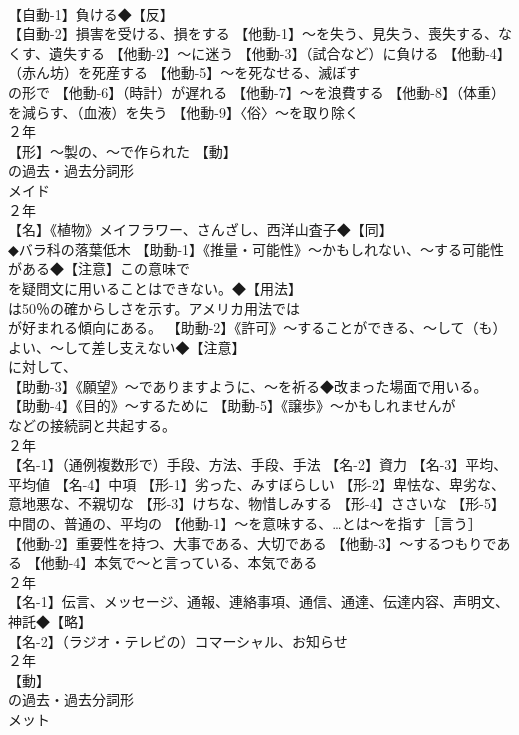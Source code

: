 \documentclass[8pt]{extreport}
\begin{document}
\begin{CJK}{UTF8}{min}
\\	【自動-1】負ける◆【反】
\\	【自動-2】損害を受ける、損をする 【他動-1】～を失う、見失う、喪失する、なくす、遺失する 【他動-2】～に迷う 【他動-3】（試合など）に負ける 【他動-4】（赤ん坊）を死産する 【他動-5】～を死なせる、滅ぼす
\\	の形で 【他動-6】（時計）が遅れる 【他動-7】～を浪費する 【他動-8】（体重）を減らす、（血液）を失う 【他動-9】〈俗〉～を取り除く
\\	２年	
\\	【形】～製の、～で作られた 【動】
\\	の過去・過去分詞形 
\\	メイド
\\	２年	
\\	【名】《植物》メイフラワー、さんざし、西洋山査子◆【同】
\\	◆バラ科の落葉低木 【助動-1】《推量・可能性》～かもしれない、～する可能性がある◆【注意】この意味で 
\\	を疑問文に用いることはできない。◆【用法】
\\	は50％の確からしさを示す。アメリカ用法では 
\\	が好まれる傾向にある。 【助動-2】《許可》～することができる、～して（も）よい、～して差し支えない◆【注意】
\\	に対して、
\\	【助動-3】《願望》～でありますように、～を祈る◆改まった場面で用いる。 【助動-4】《目的》～するために 【助動-5】《譲歩》～かもしれませんが
\\	などの接続詞と共起する。
\\	２年	
\\	【名-1】（通例複数形で）手段、方法、手段、手法 【名-2】資力 【名-3】平均、平均値 【名-4】中項 【形-1】劣った、みすぼらしい 【形-2】卑怯な、卑劣な、意地悪な、不親切な 【形-3】けちな、物惜しみする 【形-4】ささいな 【形-5】中間の、普通の、平均の 【他動-1】～を意味する、…とは～を指す［言う］ 【他動-2】重要性を持つ、大事である、大切である 【他動-3】～するつもりである 【他動-4】本気で～と言っている、本気である
\\	２年	
\\	【名-1】伝言、メッセージ、通報、連絡事項、通信、通達、伝達内容、声明文、神託◆【略】
\\	【名-2】（ラジオ・テレビの）コマーシャル、お知らせ
\\	２年	
\\	【動】
\\	の過去・過去分詞形 
\\	メット

\end{CJK}
\end{document}
